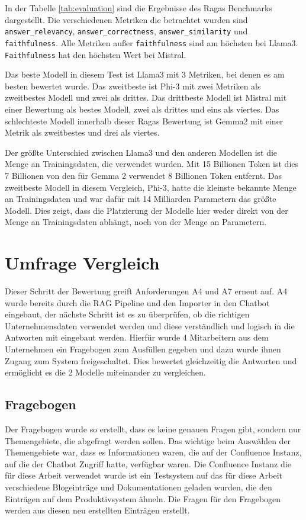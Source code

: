 In der Tabelle \ref*{tab:evaluation} sind die Ergebnisse des Ragas Benchmarks dargestellt.
Die verschiedenen Metriken die betrachtet wurden sind \verb|answer_relevancy|, 
\verb|answer_correctness|, \verb|answer_similarity| und \verb|faithfulness|.
Alle Metriken außer \verb|faithfulness| sind am höchsten bei Llama3. \verb|Faithfulness| 
hat den höchsten Wert bei Mistral. \par Das beste Modell in diesem Test ist Llama3 mit 3 Metriken,
bei denen es am besten bewertet wurde. Das zweitbeste ist Phi-3 mit zwei Metriken als zweitbestes Modell 
und zwei als drittes. Das drittbeste Modell ist Mistral mit einer Bewertung als bestes Modell, zwei als drittes 
und eins als viertes. Das schlechteste Modell innerhalb dieser Ragas Bewertung ist Gemma2 mit einer Metrik 
als zweitbestes und drei als viertes. \par
Der größte Unterschied zwischen Llama3 und den anderen Modellen ist die Menge 
an Trainingsdaten, die verwendet wurden. Mit 15 Billionen Token ist dies 7 
Billionen von den für Gemma 2 verwendet 8 Billionen Token entfernt. Das zweitbeste Modell 
in diesem Vergleich, Phi-3, hatte die kleinste bekannte Menge an Trainingsdaten und war 
dafür mit 14 Milliarden Parametern das größte Modell. Dies zeigt, dass die Platzierung der Modelle 
hier weder direkt von der Menge an Trainingsdaten abhängt, noch von der Menge an Parametern.

\section{Umfrage Vergleich}
Dieser Schritt der Bewertung greift Anforderungen A4 und A7
erneut auf. A4 wurde bereits durch die RAG Pipeline und den Importer 
in den Chatbot eingebaut, der nächste Schritt ist es zu überprüfen, ob 
die richtigen Unternehmensdaten verwendet werden und diese verständlich und 
logisch in die Antworten mit eingebaut werden.
Hierfür wurde 4 Mitarbeitern aus dem Unternehmen ein Fragebogen zum Ausfüllen 
gegeben und dazu wurde ihnen Zugang zum System freigeschaltet. Dies 
bewertet gleichzeitig die Antworten und ermöglicht es die 2 Modelle 
miteinander zu vergleichen.

\subsection{Fragebogen}
Der Fragebogen wurde so erstellt, dass es keine genauen Fragen gibt, 
sondern nur Themengebiete, die abgefragt werden sollen. 
Das wichtige 
beim Auswählen der Themengebiete war, dass es Informationen waren, die 
auf der Confluence Instanz, auf die der Chatbot Zugriff hatte, verfügbar 
waren. Die Confluence Instanz die für diese Arbeit verwendet wurde ist ein 
Testsystem auf das für diese Arbeit verschiedene Blogeinträge und Dokumentationen 
geladen wurden, die den Einträgen auf dem Produktivsystem ähneln. 
Die Fragen für den Fragebogen werden aus diesen neu erstellten 
Einträgen erstellt. \par
\bigskip

